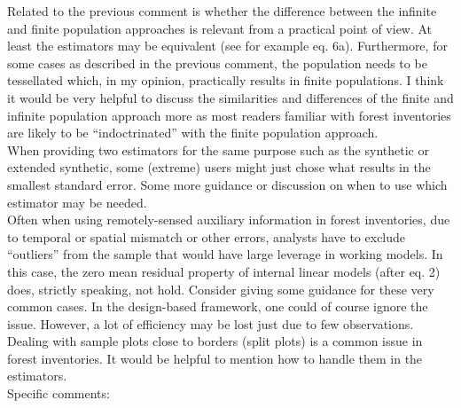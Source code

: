 \documentclass{article}
\begin{document}
Related to the previous comment is whether the difference between the infinite and finite population approaches is relevant from a practical point of view. At least the estimators may be equivalent (see for example eq. 6a). Furthermore, for some cases as described in the previous comment, the population needs to be tessellated which, in my opinion, practically results in finite populations. I think it would be very helpful to discuss the similarities and differences of the finite and infinite population approach more as most readers familiar with forest inventories are likely to be “indoctrinated” with the finite population approach.\\

When providing two estimators for the same purpose such as the synthetic or extended synthetic, some (extreme) users might just chose what results in the smallest standard error. Some more guidance or discussion on when to use which estimator may be needed.\\

Often when using remotely-sensed auxiliary information in forest inventories, due to temporal or spatial mismatch or other errors, analysts have to exclude “outliers” from the sample that would have large leverage in working models. In this case, the zero mean residual property of internal linear models (after eq. 2) does, strictly speaking, not hold. Consider giving some guidance for these very common cases. In the design-based framework, one could of course ignore the issue. However, a lot of efficiency may be lost just due to few observations.\\

Dealing with sample plots close to borders (split plots) is a common issue in forest inventories. It would be helpful to mention how to handle them in the estimators.\\


Specific comments:\\
\end{document}

